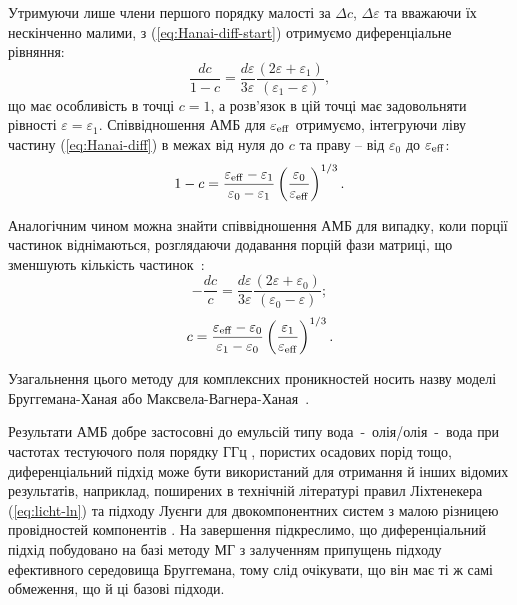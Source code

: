 \documentclass[14pt,twoside]{vakthesis}
\begin{document}
Утримуючи лише члени першого порядку  малості за $\Delta c$, $\Delta \varepsilon$ та вважаючи їх нескінченно малими, з  (\ref{eq:Hanai-diff-start}) отримуємо диференціальне рівняння:
\begin{equation}\label{eq:Hanai-diff}
\frac{d c}{1 - c} = \frac{d\varepsilon}{3\varepsilon} \frac{(2\varepsilon+\varepsilon_1)}{(\varepsilon_1 - \varepsilon)},
\end{equation}
що має особливість в точці $c = 1$, а розв'язок в цій точці має задовольняти рівності $\varepsilon = \varepsilon_1$. Співвідношення АМБ для $\varepsilon_{\rm eff}$ отримуємо, інтегруючи ліву частину (\ref{eq:Hanai-diff}) в межах від нуля до $c$ та праву -- від $\varepsilon_0$ до $\varepsilon_{\rm eff}$:
\begin{equation}\label{eq:Hanai}
1 - c = \frac{\varepsilon_{\rm eff} - \varepsilon_1}{\varepsilon_0 - \varepsilon_1} \left( \frac{{ \varepsilon_0}}{\varepsilon_{\rm eff}} \right)^{1/3}.
\end{equation}

Аналогічним чином можна знайти співвідношення АМБ для випадку, коли порції частинок віднімаються, розглядаючи додавання порцій фази матриці, що зменшують кількість частинок~\cite{Sen1981}:
\begin{equation}\label{eq:Hanai-diff-high}
-\frac{d c}{c} = \frac{d\varepsilon}{3\varepsilon} \frac{(2\varepsilon+\varepsilon_0)}{(\varepsilon_0 - \varepsilon)};
\end{equation}
\begin{equation}\label{eq:Hanai-high}
c = \frac{\varepsilon_{\rm eff} - \varepsilon_0}{\varepsilon_1 - \varepsilon_0} \left( \frac{\varepsilon_1}{\varepsilon_{\rm eff}} \right)^{1/3}.
\end{equation}

Узагальнення цього методу для комплексних проникностей носить назву моделі Бруггемана-Ханая або Максвела-Вагнера-Ханая~\cite{Hanai1960, Sen1981}.

Результати АМБ добре застосовні до емульсій типу вода~-~олія/олія~-~вода при частотах тестуючого поля порядку ГГц \cite{Hanai1960}, пористих осадових порід \cite{Sen1981} тощо, диференціальний підхід може бути використаний для отримання й інших відомих результатів, наприклад, поширених в технічній літературі правил Ліхтенекера (\ref{eq:licht-ln}) \cite{Simpkin2010} та підходу Луєнги для двокомпонентних систем з малою різницею провідностей компонентів \cite{Looyenga1965}.
На завершення підкреслимо, що диференціальний  підхід побудовано на базі методу МГ з залученням припущень підходу ефективного середовища Бруггемана, тому слід очікувати, що він має ті ж самі обмеження, що й ці базові підходи. 
\end{document}
